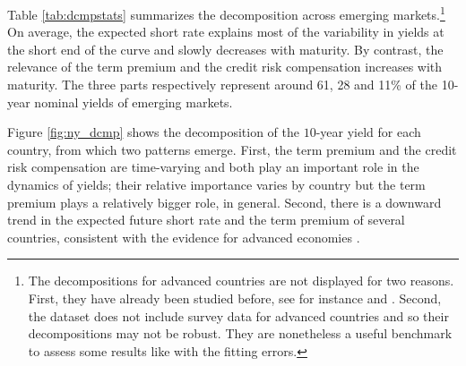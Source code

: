 {Table \ref{tab:dcmpstats} summarizes the decomposition across emerging markets.\footnote{ The decompositions for advanced countries are not displayed for two reasons. First, they have already been studied before, see for instance \cite{Wright:2011} and \cite{ACDM:2019}. Second, the dataset does not include survey data for advanced countries and so their decompositions may not be robust. They are nonetheless a useful benchmark to assess some results like with the fitting errors.} %
On average, the expected short rate explains most of the variability in yields at the short end of the curve and slowly decreases with maturity.
By contrast, the relevance of the term premium and the credit risk compensation increases with maturity. %
The three parts respectively %
represent around 61, 28 and 11\% of the 10-year nominal yields of emerging markets.

Figure \ref{fig:ny_dcmp} shows the decomposition of the \(10\)-year yield for each country, from which two patterns emerge. 
First, the term premium and the credit risk compensation are time-varying and both play an important role in the dynamics of yields;
their relative importance varies by country %
but the term premium plays a relatively bigger role, in general.
Second, there is a downward trend in the expected future short rate %
and the term premium of several countries, consistent with the evidence for advanced economies \citep{Wright:2011,ACDM:2019}.


}
